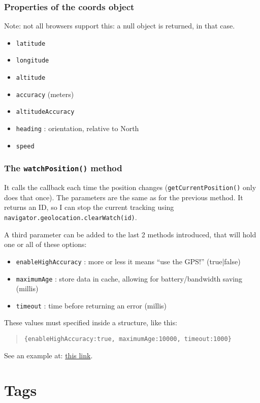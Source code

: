 \documentclass[a4paper,11pt]{book}
\begin{document}
\subsection{Properties of the coords object}
Note: not all browsers support this: a null object is returned, in that case.
\begin{itemize}
\item \texttt{latitude}
\item \texttt{longitude}
\item \texttt{altitude}
\item \texttt{accuracy} (meters)
\item \texttt{altitudeAccuracy}
\item \texttt{heading} : orientation, relative to North
\item \texttt{speed}
\end{itemize}

\subsection{The \texttt{watchPosition()} method}
It calls the callback each time the position changes (\texttt{getCurrentPosition()}
only does that once). The parameters are the same as for the previous method.
It returns an ID, so I can stop the current tracking using
\texttt{navigator.geolocation.clearWatch(id)}.

A third parameter can be added to the last 2 methods introduced, that will hold
one or all of these options:
\begin{itemize}
\item \texttt{enableHighAccuracy} : more or less it means ``use the GPS!'' (true|false)
\item \texttt{maximumAge} : store data in cache, allowing for battery/bandwidth saving (millis)
\item \texttt{timeout} : time before returning an error (millis)
\end{itemize}
These values must specified inside a structure, like this:
\begin{verse}
\begin{verbatim}
{enableHighAccuracy:true, maximumAge:10000, timeout:1000}
\end{verbatim}
\end{verse}
See an example at:
\href{http://pdata.altervista.org/HTML5/innerHTML/position.html}{this link}.



\chapter{Tags}
\end{document}
